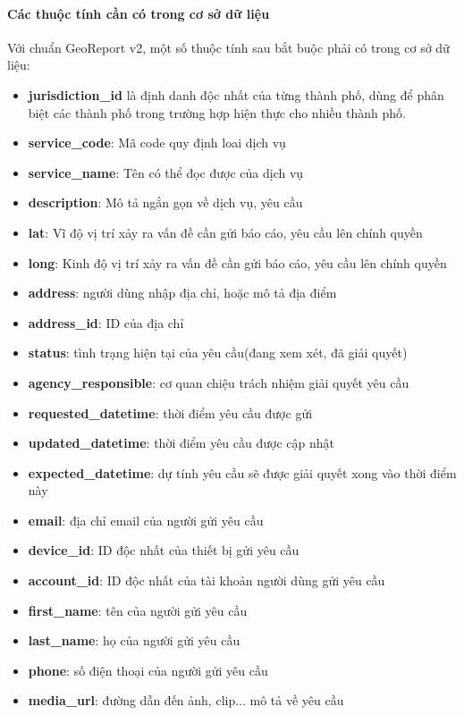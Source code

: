 \documentclass[a4paper]{article}
\begin{document}
\paragraph{Các thuộc tính cần có trong cơ sở dữ liệu}
Với chuẩn GeoReport v2, một số thuộc tính sau bắt buộc phải có trong cơ sở dữ liệu:
\begin{itemize}
	\item \textbf{jurisdiction\_id} là định danh độc nhất của từng thành phố, dùng để phân biệt các thành phố trong trường hợp hiện thực cho nhiều thành phố.
	\item \textbf{service\_code}: Mã code quy định loai dịch vụ
	\item \textbf{service\_name}: Tên có thể đọc được của dịch vụ
	\item \textbf{description}: Mô tả ngắn gọn về dịch vụ, yêu cầu
	\item \textbf{lat}: Vĩ độ vị trí xảy ra vấn đề cần gửi báo cáo, yêu cầu lên chính quyền
	\item \textbf{long}: Kinh độ vị trí xảy ra vấn đề cần gửi báo cáo, yêu cầu lên chính quyền
	\item \textbf{address}: người dùng nhập địa chỉ, hoặc mô tả địa điểm
	\item \textbf{address\_id}: ID của địa chỉ
	\item \textbf{status}: tình trạng hiện tại của yêu cầu(đang xem xét, đã giải quyết)
	\item \textbf{agency\_responsible}: cơ quan chiệu trách nhiệm giải quyết yêu cầu
	\item \textbf{requested\_datetime}: thời điểm yêu cầu được gửi
	\item \textbf{updated\_datetime}: thời điểm yêu cầu được cập nhật
	\item \textbf{expected\_datetime}: dự tính yêu cầu sẽ được giải quyết xong vào thời điểm này
	\item \textbf{email}: địa chỉ email của người gửi yêu cầu
	\item \textbf{device\_id}: ID độc nhất của thiết bị gửi yêu cầu
	\item \textbf{account\_id}: ID độc nhất của tài khoản người dùng gửi yêu cầu
	\item \textbf{first\_name}: tên của người gửi yêu cầu
	\item \textbf{last\_name}: họ của người gửi yêu cầu
	\item \textbf{phone}: số điện thoại của người gửi yêu cầu
	\item \textbf{media\_url}: đường dẫn đến ảnh, clip... mô tả về yêu cầu
\end{itemize}
\end{document}
